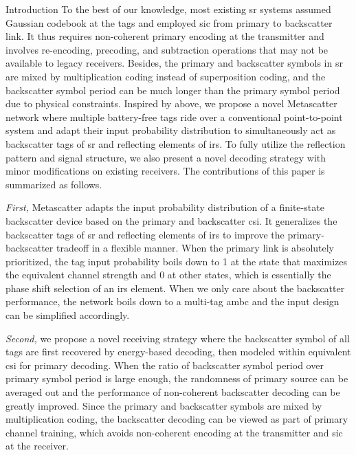 \documentclass[journal]{IEEEtran}
\begin{document}
\begin{section}{Introduction}
	To the best of our knowledge, most existing \gls{sr} systems \cite{Yang2018,Guo2019b,Ding2020,Long2020a,Zhou2019a,Wu2021a,Xu2021a} assumed Gaussian codebook at the tags and employed \gls{sic} from primary to backscatter link.
	It thus requires non-coherent primary encoding at the transmitter and involves re-encoding, precoding, and subtraction operations that may not be available to legacy receivers.
	Besides, the primary and backscatter symbols in \gls{sr} are mixed by multiplication coding instead of superposition coding, and the backscatter symbol period can be much longer than the primary symbol period due to physical constraints.
	Inspired by above, we propose a novel Metascatter network where multiple battery-free tags ride over a conventional point-to-point system and adapt their input probability distribution to simultaneously act as backscatter tags of \gls{sr} and reflecting elements of \gls{irs}.
	To fully utilize the reflection pattern and signal structure, we also present a novel decoding strategy with minor modifications on existing receivers.
	The contributions of this paper is summarized as follows.


	\emph{First,} Metascatter adapts the input probability distribution of a finite-state backscatter device based on the primary and backscatter \gls{csi}.
	It generalizes the backscatter tags of \gls{sr} and reflecting elements of \gls{irs} to improve the primary-backscatter tradeoff in a flexible manner.
	When the primary link is absolutely prioritized, the tag input probability boils down to \num{1} at the state that maximizes the equivalent channel strength and \num{0} at other states, which is essentially the phase shift selection of an \gls{irs} element.
	When we only care about the backscatter performance, the network boils down to a multi-tag \gls{ambc} and the input design can be simplified accordingly.

	\emph{Second,} we propose a novel receiving strategy where the backscatter symbol of all tags are first recovered by energy-based decoding, then modeled within equivalent \gls{csi} for primary decoding.
	When the ratio of backscatter symbol period over primary symbol period is large enough, the randomness of primary source can be averaged out and the performance of non-coherent backscatter decoding can be greatly improved.
	Since the primary and backscatter symbols are mixed by multiplication coding, the backscatter decoding can be viewed as part of primary channel training, which avoids non-coherent encoding at the transmitter and \gls{sic} at the receiver.


\end{section}
\end{document}
